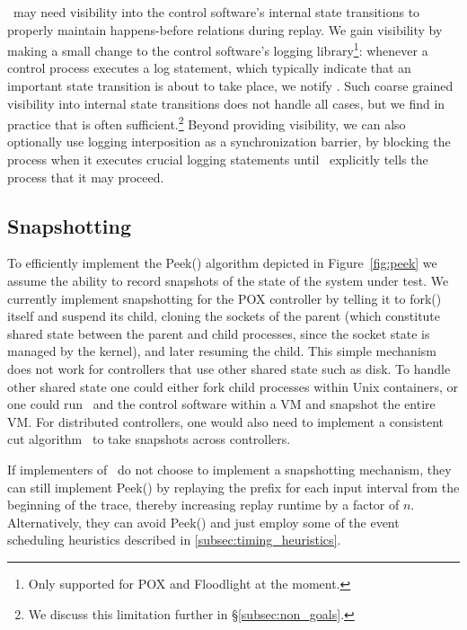 \projectname~may need visibility into the control software's internal state
transitions to properly maintain happens-before relations during replay. We
gain visibility by making a
small change to the control software's logging library\footnote{Only supported
for POX and Floodlight at the moment.}: whenever a control process executes a log
statement, which typically indicate that an important state transition is about to take
place, we notify \projectname. Such coarse grained visibility into internal
state transitions does not handle all cases, but we find in practice that is often
sufficient.\footnote{We discuss this limitation further in \S\ref{subsec:non_goals}.} Beyond
providing visibility, we can also optionally use
logging interposition as a
synchronization barrier, by blocking the process when it executes crucial logging statements
until \projectname~explicitly tells the process that it may proceed.


\subsection{Snapshotting}
\label{subsec:snapshotting}

To efficiently implement the Peek() algorithm depicted in
Figure~\ref{fig:peek} we assume the ability to record snapshots of the state of the
system under test. We currently implement snapshotting for the POX
controller by telling it to fork() itself and suspend its child,
cloning the sockets of the parent
(which constitute shared state between the parent and child processes,
since the socket state is managed by the kernel),
and later resuming the child. This simple mechanism does
not work for controllers that use other shared state such as disk.
To handle other shared state one could either fork child processes within Unix containers, or one
could run \projectname~and the control software within a VM and
snapshot the entire VM. For distributed controllers, one
would also need to implement a consistent cut
algorithm~\cite{Chandy:1985:DSD:214451.214456} to take snapshots across controllers.

If implementers of \simulator~do not choose to implement a snapshotting mechanism,
they can still implement Peek() by replaying the prefix for each input
interval from the beginning of the trace, thereby increasing replay runtime by
a factor of $n$. Alternatively, they can
avoid Peek() and just employ some of the event scheduling heuristics described in
\ref{subsec:timing_heuristics}.

